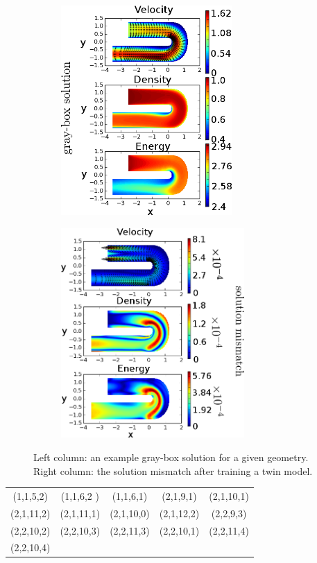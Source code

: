 \begin{figure}[htbp]\begin{center}
    \begin{subfigure}[t]{.49\textwidth}
        \centering
        \includegraphics[height=8cm]{../graysol_Ubend.png}
        \label{fig: graysol Ubend}
    \end{subfigure}
    \begin{subfigure}[t]{.49\textwidth}
        \centering
        \includegraphics[height=8cm]{../err_Ubend.png}
        \label{fig: errsol Ubend}
    \end{subfigure}
    \caption{Left column: an example gray-box solution for a given geometry. Right column:
             the solution mismatch after training a twin model.}
    \label{fig: grayErrSol Ubend}
\end{center}\end{figure}


\begin{center}\begin{tabular}{ccccc}
(1,1,5,2)  &(1,1,6,2 )&(1,1,6,1) &(2,1,9,1)  & (2,1,10,1) \\
(2,1,11,2) &(2,1,11,1)&(2,1,10,0)&(2,1,12,2) & (2,2,9,3) \\
(2,2,10,2) &(2,2,10,3)&(2,2,11,3)&(2,2,10,1) & (2,2,11,4) \\
(2,2,10,4)&          &           &           &

\end{tabular}
\label{tab: basis list 1}
\end{center}


